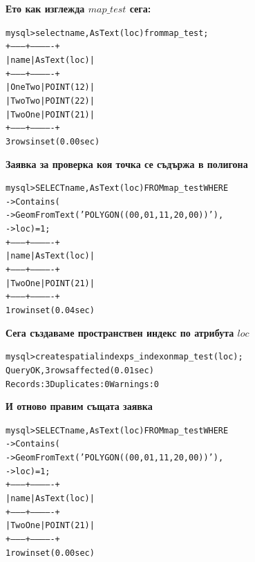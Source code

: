 \documentclass[a4paper,10pt]{article}
\begin{document}
\textbf{Ето как изглежда $map\_test$ сега:}

\begin{alltt}
mysql> select name, AsText(loc) from map_test;
+---------+-------------+
| name    | AsText(loc) |
+---------+-------------+
| One Two | POINT(1 2)  |
| Two Two | POINT(2 2)  |
| Two One | POINT(2 1)  |
+---------+-------------+
3 rows in set (0.00 sec)
\end{alltt}

\textbf{Заявка за проверка коя точка се съдържа в полигона}

\begin{alltt}
mysql> SELECT name, AsText(loc) FROM map_test WHERE
    -> Contains(
    -> GeomFromText('POLYGON((0 0, 0 1, 1 1, 2 0, 0 0))'),
    -> loc) = 1;
+---------+-------------+
| name    | AsText(loc) |
+---------+-------------+
| Two One | POINT(2 1)  |
+---------+-------------+
1 row in set (0.04 sec)
\end{alltt}

\textbf{Сега създаваме пространствен индекс по атрибута $loc$}

\begin{alltt}
mysql> create spatial index ps_index on map_test(loc);
Query OK, 3 rows affected (0.01 sec)
Records: 3  Duplicates: 0  Warnings: 0
\end{alltt}

\textbf{И отново правим същата заявка}

\begin{alltt}
mysql>  SELECT name, AsText(loc) FROM map_test WHERE
    ->  Contains(
    ->  GeomFromText('POLYGON((0 0, 0 1, 1 1, 2 0, 0 0))'),
    ->  loc) = 1;
+---------+-------------+
| name    | AsText(loc) |
+---------+-------------+
| Two One | POINT(2 1)  |
+---------+-------------+
1 row in set (0.00 sec)
\end{alltt}
\end{document}
